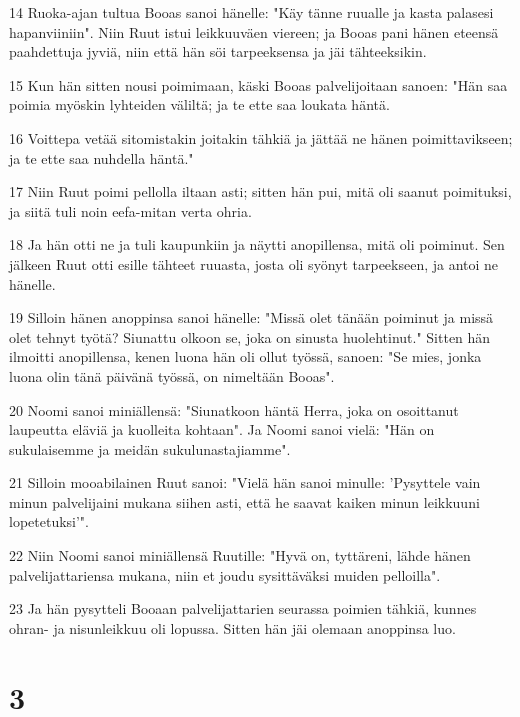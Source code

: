 \par 14 Ruoka-ajan tultua Booas sanoi hänelle: "Käy tänne ruualle ja kasta palasesi hapanviiniin". Niin Ruut istui leikkuuväen viereen; ja Booas pani hänen eteensä paahdettuja jyviä, niin että hän söi tarpeeksensa ja jäi tähteeksikin.
\par 15 Kun hän sitten nousi poimimaan, käski Booas palvelijoitaan sanoen: "Hän saa poimia myöskin lyhteiden väliltä; ja te ette saa loukata häntä.
\par 16 Voittepa vetää sitomistakin joitakin tähkiä ja jättää ne hänen poimittavikseen; ja te ette saa nuhdella häntä."
\par 17 Niin Ruut poimi pellolla iltaan asti; sitten hän pui, mitä oli saanut poimituksi, ja siitä tuli noin eefa-mitan verta ohria.
\par 18 Ja hän otti ne ja tuli kaupunkiin ja näytti anopillensa, mitä oli poiminut. Sen jälkeen Ruut otti esille tähteet ruuasta, josta oli syönyt tarpeekseen, ja antoi ne hänelle.
\par 19 Silloin hänen anoppinsa sanoi hänelle: "Missä olet tänään poiminut ja missä olet tehnyt työtä? Siunattu olkoon se, joka on sinusta huolehtinut." Sitten hän ilmoitti anopillensa, kenen luona hän oli ollut työssä, sanoen: "Se mies, jonka luona olin tänä päivänä työssä, on nimeltään Booas".
\par 20 Noomi sanoi miniällensä: "Siunatkoon häntä Herra, joka on osoittanut laupeutta eläviä ja kuolleita kohtaan". Ja Noomi sanoi vielä: "Hän on sukulaisemme ja meidän sukulunastajiamme".
\par 21 Silloin mooabilainen Ruut sanoi: "Vielä hän sanoi minulle: 'Pysyttele vain minun palvelijaini mukana siihen asti, että he saavat kaiken minun leikkuuni lopetetuksi'".
\par 22 Niin Noomi sanoi miniällensä Ruutille: "Hyvä on, tyttäreni, lähde hänen palvelijattariensa mukana, niin et joudu sysittäväksi muiden pelloilla".
\par 23 Ja hän pysytteli Booaan palvelijattarien seurassa poimien tähkiä, kunnes ohran- ja nisunleikkuu oli lopussa. Sitten hän jäi olemaan anoppinsa luo.

\chapter{3}

